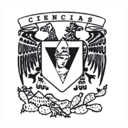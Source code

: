 \begin{titlepage}
\center%
\newcommand{\HRule}{\rule{\linewidth}{0.5mm}} 

\includegraphics[width=4.5cm]{IMA/Ciencias.png} \\ 




\end{titlepage}
